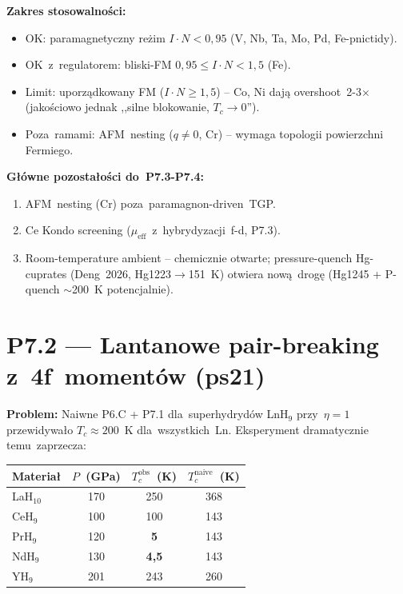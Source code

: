 \medskip\noindent\textbf{Zakres stosowalno\'sci:}
\begin{itemize}\itemsep0pt
  \item OK: paramagnetyczny re\.zim $I\cdot N\!<\!0{,}95$ (V, Nb, Ta, Mo, Pd, Fe-pnictidy).
  \item OK~z~regulatorem: bliski-FM $0{,}95\!\le\!I\cdot N\!<\!1{,}5$ (Fe).
  \item Limit: uporz\k{a}dkowany FM ($I\cdot N\!\ge\!1{,}5$) -- Co, Ni daj\k{a} overshoot~2-3$\times$ (jako\'sciowo jednak ,,silne blokowanie, $T_c\to0$'').
  \item Poza~ramami: AFM~nesting ($q\!\ne\!0$, Cr) -- wymaga topologii powierzchni Fermiego.
\end{itemize}

\medskip\noindent\textbf{G\l{}\'owne pozosta\l{}o\'sci do~P7.3-P7.4:}
\begin{enumerate}\itemsep0pt
  \item AFM~nesting (Cr) poza~paramagnon-driven~TGP.
  \item Ce Kondo screening ($\mu_\text{eff}$~z~hybrydyzacji~f-d, P7.3).
  \item Room-temperature ambient -- chemicznie otwarte; pressure-quench
    Hg-cuprates (Deng~2026, Hg1223$\to$151~K) otwiera now\k{a}~drog\k{e}
    (Hg1245 + P-quench $\sim$200~K potencjalnie).
\end{enumerate}

\section*{P7.2 --- Lantanowe pair-breaking z~4f~moment\'ow (ps21)}

\noindent\textbf{Problem:} Naiwne P6.C + P7.1 dla~superhydryd\'ow LnH$_9$ przy~$\eta\!=\!1$
przewidywa\l{}o $T_c\!\approx\!200$~K dla~wszystkich~Ln. Eksperyment dramatycznie temu~zaprzecza:

\begin{center}\small
\begin{tabular}{lccc}
Materia\l{} & $P$~(GPa) & $T_c^\text{obs}$~(K) & $T_c^\text{naive}$~(K)\\
\hline
LaH$_{10}$ & 170 & 250 & 368 \\
CeH$_9$    & 100 & 100 & 143 \\
PrH$_9$    & 120 & \textbf{5}   & 143 \\
NdH$_9$    & 130 & \textbf{4,5} & 143 \\
YH$_9$     & 201 & 243 & 260 \\
\end{tabular}
\end{center}

